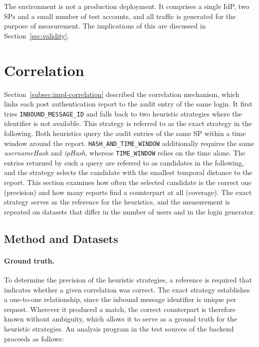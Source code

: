 \documentclass[../main.tex]{subfiles}
\begin{document}
The environment is not a production deployment. 
It comprises a single IdP, two SPs and a small number of test accounts, and all traffic is generated 
for the purpose of measurement. 
The implications of this are discussed in Section~\ref{sec:validity}.

\section{Correlation}\label{sec:eval-correlation}

Section~\ref{subsec:impl-correlation} described the correlation mechanism, which links each 
post authentication report to the audit entry of the same login. 
It first tries \texttt{INBOUND\_\allowbreak{}MESSAGE\_\allowbreak{}ID} and falls back to two 
heuristic strategies where the identifier is not available. 
This strategy is referred to as the exact strategy in the following. 
Both heuristics query the audit entries of the same SP within a time window around the report. 
\texttt{HASH\_\allowbreak{}AND\_\allowbreak{}TIME\_\allowbreak{}WINDOW} additionally requires the 
same \textit{usernameHash} and \textit{ipHash}, whereas \texttt{TIME\_\allowbreak{}WINDOW} relies 
on the time alone. 
The entries returned by such a query are referred to as candidates in the following, and the 
strategy selects the candidate with the smallest temporal distance to the report. 
This section examines how often the selected candidate is the correct one (precision) and how 
many reports find a counterpart at all (coverage). 
The exact strategy serves as the reference for the heuristics, and the measurement is repeated on 
datasets that differ in the number of users and in the login generator. 

\subsection{Method and Datasets}\label{subsec:eval-correlation-method}

\paragraph{Ground truth.}
To determine the precision of the heuristic strategies, a reference is required that indicates 
whether a given correlation was correct. 
The exact strategy establishes a one-to-one relationship, since the inbound message identifier is 
unique per request. 
Wherever it produced a match, the correct counterpart is therefore known without ambiguity, which 
allows it to serve as a ground truth for the heuristic strategies. 
An analysis program in the test sources of the backend proceeds as follows:
\end{document}
